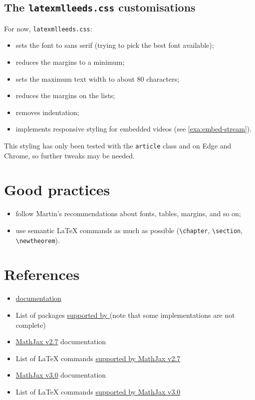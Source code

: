 \documentclass[a4paper]{article}
\theoremstyle{definition}
\begin{document}
\subsection{The \texttt{latexmlleeds.css} customisations}
For now, \verb|latexmlleeds.css|:
\begin{itemize}
  \item sets the font to sans serif (trying to pick the best font available);
  \item reduces the margins to a minimum;
  \item sets the maximum text width to about 80 characters;
  \item reduces the margins on the lists;
  \item removes indentation;
  \item implements responsive styling for embedded videos (see \autoref{exa:embed-stream}).
\end{itemize}
This styling has only been tested with the \verb|article| class and on Edge and Chrome, so further tweaks may be needed.

\section{Good practices}
\begin{itemize}
  \item follow Martin's recommendations about fonts, tables, margins, and so on;
  \item use semantic \LaTeX{} commands as much as possible (\verb|\chapter|, \verb|\section|, \verb|\newtheorem|).
\end{itemize}

\section{References}
\begin{itemize}
  \item \href{https://dlmf.nist.gov/LaTeXML/docs.html}{\LaTeXML{} documentation}
  \item List of packages \href{https://dlmf.nist.gov/LaTeXML/manual/included.bindings/}{supported by \LaTeXML{}} (note that some implementations are not complete)
  \item \href{http://docs.mathjax.org/en/v2.7-latest/}{MathJax v2.7} documentation
  \item List of \LaTeX{} commands \href{http://docs.mathjax.org/en/v2.7-latest/tex.html#supported-latex-commands}{supported by MathJax v2.7}
  \item \href{http://docs.mathjax.org/en/v3.0-latest/}{MathJax v3.0} documentation
  \item List of \LaTeX{} commands \href{http://docs.mathjax.org/en/v3.0-latest/input/tex/macros/index.html}{supported by MathJax v3.0}
\end{itemize}
\end{document}
